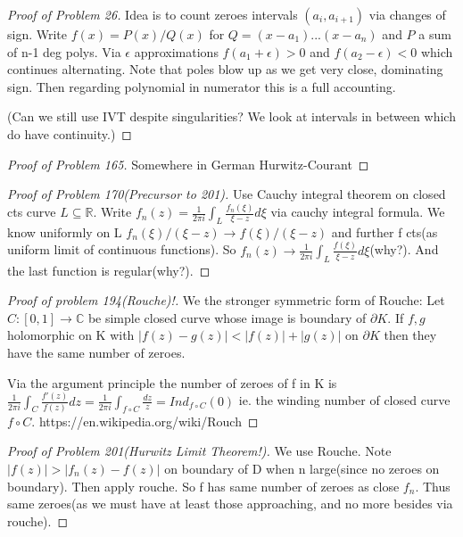 \documentclass[10pt]{article}
\newcommand{\1}{\textbf{1}}
\newcommand{\R}{\mathbb{R}}
\newcommand{\C}{\mathbb{C}}
\theoremstyle{remark}
\theoremstyle{definition}
\begin{document}
\begin{proof}[Proof of Problem 26]
	Idea is to count zeroes intervals $(a_i,a_{i+1})$ via changes of sign. Write $f(x) = P(x)/Q(x)$ for $Q = (x-a_1)...(x-a_n)$ and $P$ a sum of n-1 deg polys. Via $\epsilon$ approximations $f(a_1+\epsilon) > 0$ and $f(a_2 -\epsilon) <0$ which continues alternating. Note that poles blow up as we get very close, dominating sign. Then regarding polynomial in numerator this is a full accounting.

	(Can we still use IVT despite singularities? We look at intervals in between which do have continuity.) 
\end{proof}

\begin{proof}[Proof of Problem 165]
	Somewhere in German Hurwitz-Courant
\end{proof}

\begin{proof}[Proof of Problem 170(Precursor to 201)]
	Use Cauchy integral theorem on closed cts curve $L \subseteq \R$. Write $f_n(z) = \frac{1}{2 \pi i }\int_L \frac{f_n(\xi)}{\xi-z}d\xi$ via cauchy integral formula. We know uniformly on L $f_n(\xi)/(\xi - z) \to f(\xi)/(\xi -z)$ and further f cts(as uniform limit of continuous functions). So $f_n(z) \to \frac{1}{2 \pi i} \int_L \frac{f(\xi)}{\xi -z}d \xi$(why?). And the last function is regular(why?).
\end{proof}

\begin{proof}[Proof of problem 194(Rouche)!]
	We the stronger symmetric form of Rouche: Let $C: [0,1] \to \C$ be simple closed curve whose image is boundary of $\partial K$. If $f,g$ holomorphic on K with $|f(z) - g(z)| < |f(z)|+|g(z)|$ on $\partial K$ then they have the same number of zeroes. 

	Via the argument principle the number of zeroes of f in K is $\frac{1}{2 \pi i} \int_C \frac{f'(z)}{f(z)}dz = \frac{1}{2\pi i}\int_{f \circ C} \frac{dz}{z} = Ind_{f\circ C}(0)$ ie. the winding number of closed curve $f \circ C$. https://en.wikipedia.org/wiki/Rouch%
\end{proof}

\begin{proof}[Proof of Problem 201(Hurwitz Limit Theorem!)]
	We use Rouche. Note $|f(z)| > |f_n(z) - f(z)|$ on boundary of D when n large(since no zeroes on boundary). Then apply rouche. So f has same number of zeroes as close $f_n$. Thus same zeroes(as we must have at least those approaching, and no more besides via rouche).
\end{proof}
\end{document}
